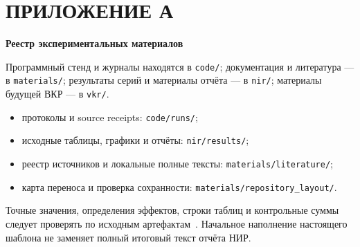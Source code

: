 \chapter*{ПРИЛОЖЕНИЕ А}
\begin{center}\bfseries Реестр экспериментальных материалов\end{center}
\noindent Программный стенд и журналы находятся в \texttt{code/}; документация и литература --- в \texttt{materials/}; результаты серий и материалы отчёта --- в \texttt{nir/}; материалы будущей ВКР --- в \texttt{vkr/}.

\begin{itemize}
\item протоколы и source receipts: \texttt{code/runs/};
\item исходные таблицы, графики и отчёты: \texttt{nir/results/};
\item реестр источников и локальные полные тексты: \texttt{materials/literature/};
\item карта переноса и проверка сохранности: \texttt{materials/repository\_layout/}.
\end{itemize}

Точные значения, определения эффектов, строки таблиц и контрольные суммы следует проверять по исходным артефактам~\cite{v4tests,v4audit}. Начальное наполнение настоящего шаблона не заменяет полный итоговый текст отчёта НИР.
